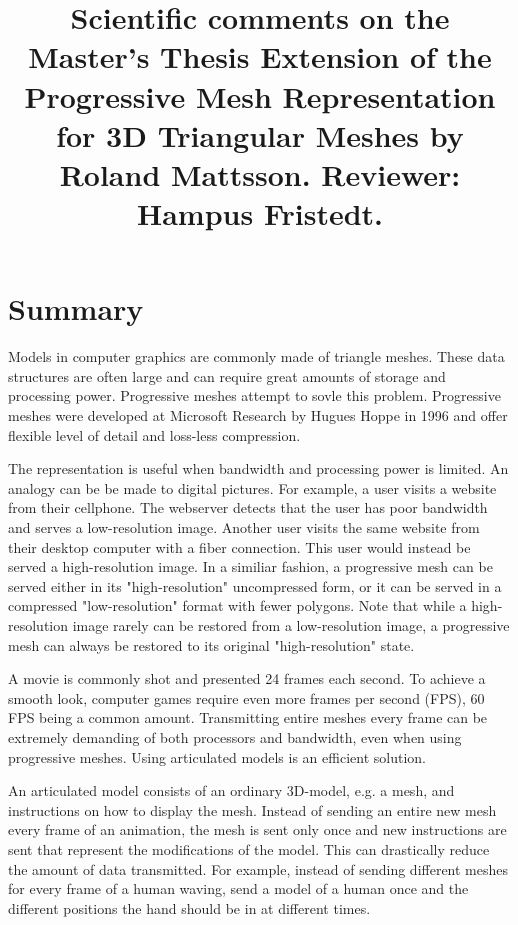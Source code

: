 \documentclass{article}
\title{Scientific comments on the Master's Thesis Extension of the Progressive Mesh Representation for 3D Triangular Meshes by Roland Mattsson. Reviewer:
Hampus Fristedt.}
\begin{document}
\maketitle

\newpage

\section{Summary}

Models in computer graphics are commonly made of triangle meshes. These data
structures are often large and can require great amounts of storage and
processing power. Progressive meshes attempt to sovle this problem. Progressive
meshes were developed at Microsoft Research by Hugues Hoppe in 1996 and offer
flexible level of detail and loss-less compression. 

The representation is useful when bandwidth and processing power is limited. An
analogy can be be made to digital pictures. For example, a user visits a website
from their cellphone. The webserver detects that the user has poor bandwidth and
serves a low-resolution image. Another user visits the same website from their
desktop computer with a fiber connection. This user would instead be served a
high-resolution image. In a similiar fashion, a progressive mesh can be served
either in its "high-resolution" uncompressed form, or it can be served in a
compressed "low-resolution" format with fewer polygons. Note that while a
high-resolution image rarely can be restored from a low-resolution image, a
progressive mesh can always be restored to its original "high-resolution" state.

A movie is commonly shot and presented 24 frames each second. To achieve a
smooth look, computer games require even more frames per second (FPS), 60 FPS
being a common amount. Transmitting entire meshes every frame can be extremely
demanding of both processors and bandwidth, even when using progressive meshes.
Using articulated models is an efficient solution.

An articulated model consists of an ordinary 3D-model, e.g. a mesh, and
instructions on how to display the mesh. Instead of sending an entire new mesh
every frame of an animation, the mesh is sent only once and new instructions are
sent that represent the modifications of the model. This can drastically reduce
the amount of data transmitted. For example, instead of sending different meshes
for every frame of a human waving, send a model of a human once and the
different positions the hand should be in at different times.
\end{document}
